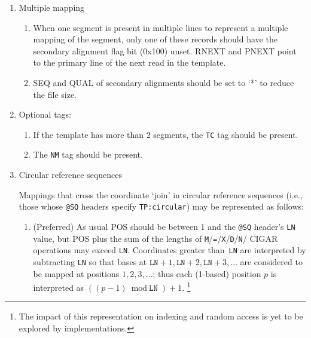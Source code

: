 \documentclass[10pt]{article}
\newcommand*{\cigarops}[1]{\cigaropsAux#1*}
\def\cigaropsAux#1#2*{{\tt #1}\if\relax\detokenize{#2}\relax\else/\cigaropsAux#2*\fi}
\begin{document}
\begin{enumerate}
\begin{enumerate}[label=\arabic*]
      Specifically this includes {\sf RNAME} (`{\tt *}', but see caveat),
      {\sf POS} (`{\tt 0}', see caveat), {\sf CIGAR} (`{\tt *}'),
      {\sf MAPQ} ('{\tt 0}') and {\sf FLAG} bits 0x2, 0x100 and 0x800
      (all unset).

      One caveat to this is with paired sequencing protocols where one record
      is aligned and one unaligned within a pair.  See item 1 above.
  \end{enumerate}
\item Multiple mapping
  \begin{enumerate}[label=\arabic*]
  \item When one segment is present in multiple lines to represent a multiple
	mapping of the segment, only one of these records should have the secondary
	alignment flag bit (0x100) unset. {\sf RNEXT} and {\sf PNEXT} point to the
	primary line of the next read in the template.
  \item {\sf SEQ} and {\sf QUAL} of secondary alignments should be set
    to `*' to reduce the file size.
  \end{enumerate}
\item Optional tags:
  \begin{enumerate}[label=\arabic*]
  \item If the template has more than 2 segments, the {\tt TC} tag
    should be present.
  \item The {\tt NM} tag should be present.
  \end{enumerate}

\item Circular reference sequences

Mappings that cross the coordinate `join' in circular reference sequences (i.e., those whose {\tt @SQ} headers specify {\tt TP:circular}) may be represented as follows:
  \begin{enumerate}[label=\arabic*]
  \item (Preferred)
As usual {\sf POS} should be between 1 and the {\tt @SQ} header's {\tt LN} value, but {\sf POS} plus the sum of the lengths of \cigarops{M=XDN} {\sf CIGAR} operations may exceed {\tt LN}.
Coordinates greater than~{\tt LN} are interpreted by subtracting {\tt LN} so that bases at $\texttt{LN}+1, \texttt{LN}+2, \texttt{LN}+3, \ldots$ are considered to be mapped at positions $1,2,3,\ldots$; thus each (1-based) position $p$ is interpreted as $((p-1)\bmod\texttt{LN})+1$.%
\footnote{The impact of this representation on indexing and random access is yet to be explored by implementations.}


\end{enumerate}
\end{enumerate}
\end{document}
